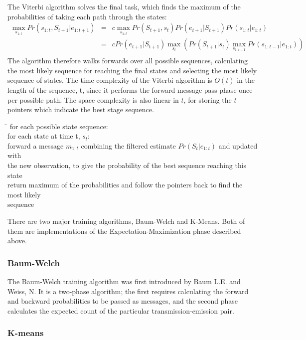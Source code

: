 \documentclass[12pt,a4,notitlepage]{report}
\renewcommand{\_}{\texttt{\symbol{95}}}
\newcommand{\<}{\texttt{\symbol{60}}}
\renewcommand{\>}{\texttt{\symbol{62}}}
\newenvironment{pseudocode}{\begin{slshape}\begin{tabbing}\hspace*{0.5cm}\=\hspace*{0.5cm}\=\hspace*{0.5cm}\= \kill }{\end{tabbing}\end{slshape}}
\begin{document}
The Viterbi algorithm solves the final task, which finds the maximum of the probabilities of taking each path through the states:
\begin{eqnarray*}
\max_{s_{1:t}} Pr(s_{1:t},S_{t+1}|e_{1:t+1}) &=& c \max_{s_{1:t}} Pr(S_{t+1},s_t) Pr(e_{t+1}|S_{t+1}) Pr(s_{1:t}|e_{1:t}) \\
 &=& c Pr (e_{t+1}|S_{t+1}) \max_{s_t}\left( Pr(S_{t+1}|s_t) \max_{s_{1:t-1}} Pr(s_{1:t-1}|e_{1:t}) \right) \\
\end{eqnarray*}
The algorithm therefore walks forwards over all possible sequences, calculating the most likely sequence for reaching the final states and selecting the most likely sequence of states. The time complexity of the Viterbi algorithm is $O(t)$ in the length of the sequence, t, since it performs the forward message pass phase once per possible path. The space complexity is also linear in $t$, for storing the $t$ pointers which indicate the best stage sequence.\cite{AIModern}
\begin{pseudocode}
for each possible state sequence: \\
\>  for each state at time t, $s_t$: \\
\>\>    forward a message $m_{1:t}$ combining the filtered estimate $Pr(S_t|e_{1:t})$ and updated with \\\>\>the new observation, to give the probability of the best sequence reaching this state \\
\> return maximum of the probabilities and follow the pointers back to find the most likely\\
\>\> sequence
\end{pseudocode}
There are two major training algorithms, Baum-Welch and K-Means. Both of them are implementations of the Expectation-Maximization phase described above.

\subsubsection{Baum-Welch}

The Baum-Welch training algorithm was first introduced by Baum L.E. and Weiss, N\cite{Baum-Welch}. It is a two-phase algorithm; the first requires calculating the forward and backward probabilities to be passed as messages, and the second phase calculates the expected count of the particular transmission-emission pair.

\subsubsection{K-means}
\end{document}
